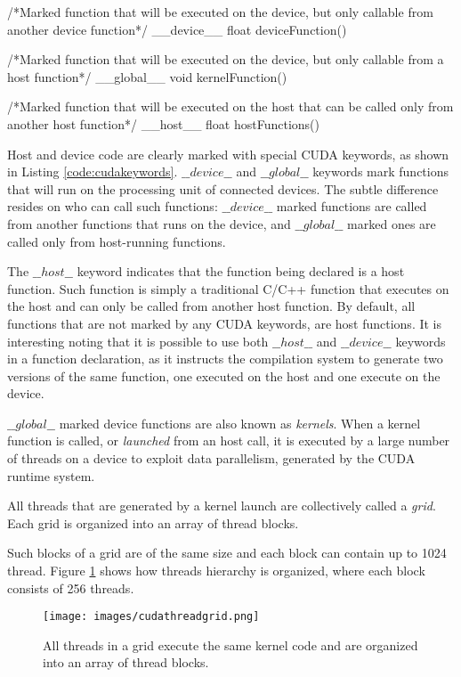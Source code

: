 \documentclass[12pt,a4paper]{extarticle}
\newcommand{\linespace}{\vspace{0pt}}
\begin{document}
\begin{cpp}[caption={CUDA keywords for function declarations},label=code:cudakeywords]
/*Marked function that will be executed on the device, but only 
	callable from another device function*/
__device__ float deviceFunction()

/*Marked function that will be executed on the device, but only 
	callable from a host function*/
__global__ void kernelFunction()

/*Marked function that will be executed on the host that can be 
	called only from another host function*/
__host__ float hostFunctions()
\end{cpp}


Host and device code are clearly marked with special CUDA keywords, as shown in Listing \ref{code:cudakeywords}. $\_\_device\_\_$ and $\_\_global\_\_$ keywords mark functions that will run on the processing unit of connected devices. The subtle difference resides on who can call such functions: $\_\_device\_\_$ marked functions are called from another functions that runs on the device, and $\_\_global\_\_$ marked ones are called only from host-running functions. 
\linespace

The $\_\_host\_\_$ keyword indicates that the function being declared is a host function. Such function is simply a traditional C/C++ function that executes on the host and can only be called from another host function. By default, all functions that are not marked by any CUDA keywords, are host functions. It is interesting noting that it is possible to use both $\_\_host\_\_$ and $\_\_device\_\_$ keywords in a function declaration, as it instructs the compilation system to generate two versions of the same function, one executed on the host and one execute on the device.
\linespace

$\_\_global\_\_$ marked device functions are also known as \textit{kernels}. When a kernel function is called, or \textit{launched} from an host call, it is executed by a large number of threads on a device to exploit data parallelism, generated by the CUDA runtime system.

All threads that are generated by a kernel launch are collectively called a \textit{grid}. Each grid is organized into an array of thread blocks.

Such blocks of a grid are of the same size and each block can contain up to 1024 thread. Figure \ref{fig:cudagridblock} shows how threads hierarchy is organized, where each block consists of 256 threads.
\begin{figure}[hbtp]
\centering
\texttt{[image: images/cudathreadgrid.png]}
\caption{All threads in a grid execute the same kernel code and are organized into an array of thread blocks.}
\label{fig:cudagridblock}
\end{figure}
\end{document}

